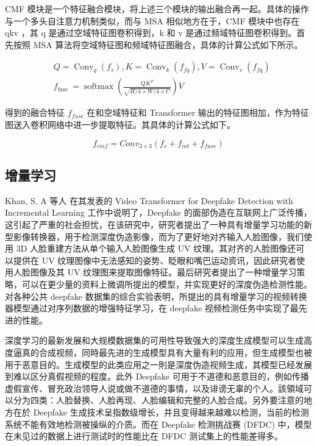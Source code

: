 CMF 模块是一个特征融合模块，将上述三个模块的输出融合再一起。具体的操作与一个多头自注意力机制类似，而与 MSA 相似地方在于，CMF 模块中也存在 qkv ，其 q 是通过空域特征图卷积得到，k 和 v 是通过频域特征图卷积得到。首先按照 MSA 算法将空域特征图和频域特征图融合，具体的计算公式如下所示。

$$
\begin{aligned}
&Q=\operatorname{Conv}_{q}\left(f_{s}\right), K=\operatorname{Conv}_{k}\left(f_{f q}\right), V=\operatorname{Conv}_{v}\left(f_{f q}\right) \\
&f_{\text {fuse }}=\operatorname{softmax}\left(\frac{Q K^{T}}{\sqrt{H / 4 \times W / 4 \times C}}\right) V
\end{aligned}
$$

得到的融合特征 $f_{fuse}$ 在和空域特征和 Transformer 输出的特征图相加，作为特征图送入卷积网络中进一步提取特征。其具体的计算公式如下。

$$
f_{c m f}=C o n v_{3 \times 3}\left(f_{s}+f_{m t}+f_{f u s e}\right)
$$


\subsection{增量学习}

Khan, S. A 等人 \cite{khan2021video} 在其发表的 Video Transformer for Deepfake Detection with Incremental Learning 工作中说明了，Deepfake 的面部伪造在互联网上广泛传播，这引起了严重的社会担忧，在该研究中，研究者提出了一种具有增量学习功能的新型影像转换器，用于检测深度伪造影像，而为了更好地对齐输入人脸图像，我们使用 3D 人脸重建方法从单个输入人脸图像生成 UV 纹理。其对齐的人脸图像还可以提供在 UV 纹理图像中无法感知的姿势、眨眼和嘴巴运动资讯，因此研究者使用人脸图像及其 UV 纹理图来提取图像特征。最后研究者提出了一种增量学习策略，可以在更少量的资料上微调所提出的模型，并实现更好的深度伪造检测性能。对各种公共 deepfake 数据集的综合实验表明，所提出的具有增量学习的视频转换器模型通过对序列数据的增强特征学习，在 deepfake 视频检测任务中实现了最先进的性能。

深度学习的最新发展和大规模数据集的可用性导致强大的深度生成模型可以生成高度逼真的合成视频，同時最先进的生成模型具有大量有利的应用，但生成模型也被用于恶意目的。生成模型的此类应用之一則是深度伪造视频生成，其模型已经发展到难以区分真假视频的程度。此外 Deepfake 可用于不道德和恶意目的，例如传播虚假宣传、冒充政治领导人说或做不道德的事情，以及诽谤无辜的个人。該領域可以分为四类：人脸替换、人脸再现、人脸编辑和完整的人脸合成。另外要注意的地方在於 Deepfake 生成技术呈指数级增长，并且变得越来越难以检测，当前的检测系统不能有效地检测被操纵的介质。而在 Deepfake 检测挑战赛 (DFDC) 中，模型在未见过的数据上进行测试时的性能比在 DFDC 测试集上的性能差得多。

